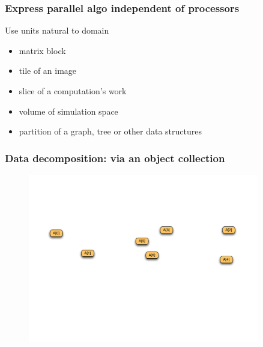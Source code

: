 {
\begin{frame}[t]
  \frametitle{Express parallel algo independent of processors}
  Use units natural to domain
  \begin{itemize}
    \item matrix block
    \item tile of an image
    \item slice of a computation's work
    \item volume of simulation space
    \item partition of a graph, tree or other data structures
  \end{itemize}
\end{frame}
}

\begin{frame}
  \frametitle{Data decomposition: via an object collection}
  \begin{figure}\includegraphics[width=0.9\textwidth]{../figures/progmodel/02-data-decomp-via-arrays.pdf}\end{figure}
\end{frame}



